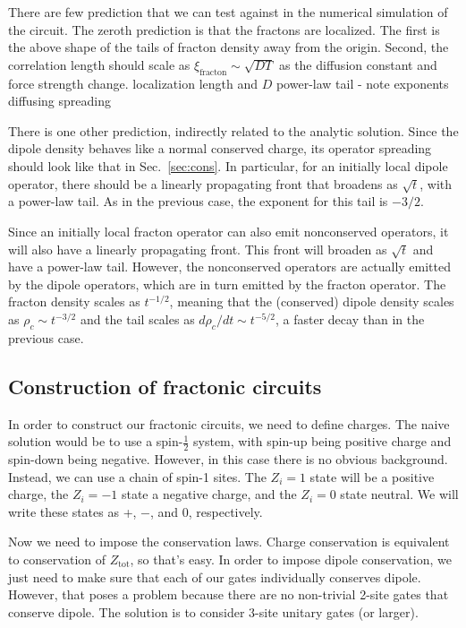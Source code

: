 \documentclass[a4paper,12pt]{article}
\renewcommand{\th}[1]{\frac{1}{#1}}
\begin{document}
There are few prediction that we can test against in the numerical simulation of the circuit. The zeroth prediction is that the fractons are localized. The first is the above shape of the tails of fracton density away from the origin. Second, the correlation length should scale as $\xi_\text{fracton}\sim \sqrt{DT}$ as the diffusion constant and force strength change. 
localization length and $D$
power-law tail - note exponents
diffusing spreading

There is one other prediction, indirectly related to the analytic solution. Since the dipole density behaves like a normal conserved charge, its operator spreading should look like that in Sec.~\ref{sec:cons}. In particular, for an initially local dipole operator, there should be a linearly propagating front that broadens as $\sqrt{t}$, with a power-law tail. As in the previous case, the exponent for this tail is $-3/2$.

Since an initially local fracton operator can also emit nonconserved operators, it will also have a linearly propagating front. This front will broaden as $\sqrt{t}$ and have a power-law tail. However, the nonconserved operators are actually emitted by the dipole operators, which are in turn emitted by the fracton operator. The fracton density scales as $t^{-1/2}$, meaning that the (conserved) dipole density scales as $\rho_c\sim t^{-3/2}$ and the tail scales as $d\rho_c/dt\sim t^{-5/2}$, a faster decay than in the previous case. 

\subsection{Construction of fractonic circuits} \label{sub:construct}

In order to construct our fractonic circuits, we need to define charges. The naive solution would be to use a spin-$\th{2}$ system, with spin-up being positive charge and spin-down being negative. However, in this case there is no obvious background. Instead, we can use a chain of spin-1 sites. The $Z_i=1$ state will be a positive charge, the $Z_i=-1$ state a negative charge, and the $Z_i=0$ state neutral. We will write these states as +, $-$, and 0, respectively.

Now we need to impose the conservation laws. Charge conservation is equivalent to conservation of $Z_\text{tot}$, so that's easy. In order to impose dipole conservation, we just need to make sure that each of our gates individually conserves dipole. However, that poses a problem because there are no non-trivial 2-site gates that conserve dipole. The solution is to consider 3-site unitary gates (or larger).
\end{document}
